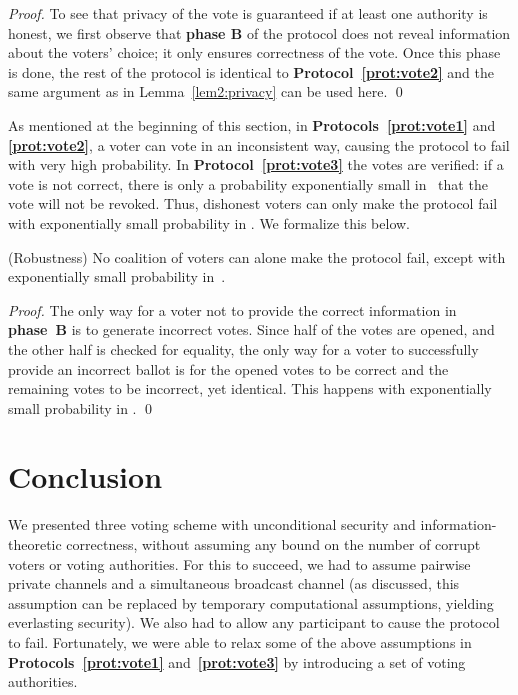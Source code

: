\documentclass[runningheads]{llncs}
\begin{document}
\begin{proof}
To see that privacy of the vote is guaranteed if at least one
authority is honest, we first observe that \textbf{phase B} of the
protocol does not reveal information about the voters' choice; it
only ensures correctness of the vote. Once this phase is done, the
rest of the protocol is identical to
\textbf{Protocol~\ref{prot:vote2}} and the same argument as in
Lemma~\ref{lem2:privacy} can be used here. \qed
\end{proof}

As mentioned at the beginning of this section, in
\textbf{Protocols~\ref{prot:vote1}} and \textbf{\ref{prot:vote2}}, a
voter can vote in an inconsistent way, causing the protocol to fail
with very high probability. In \textbf{Protocol~\ref{prot:vote3}}
the votes are verified: if a vote is not correct, there is only a
probability exponentially small in~ that the vote will not be
revoked. Thus, dishonest voters can only make the protocol fail with
exponentially small probability in . We formalize this below.


\begin{lemma}(Robustness)
\label{lem3:robustness} No coalition of voters can alone make the
protocol fail, except with exponentially small probability in~.
\end{lemma}

\begin{proof}
The only way for a voter not to provide the correct information in
\textbf{phase~B} is to generate incorrect votes. Since half of the
votes are opened, and the other half is checked for equality, the
only way for a voter to successfully provide an incorrect ballot is
for the  opened votes to be correct and the  remaining votes
to be incorrect, yet identical. This happens with exponentially
small probability in . \qed
\end{proof}

\section{Conclusion}

We presented three voting scheme with unconditional security and
information-theoretic correctness,  without assuming any bound on
the number of corrupt voters or voting authorities. For this to
succeed, we had to assume pairwise private channels and a
simultaneous broadcast channel (as discussed, this assumption can be
replaced by temporary computational assumptions, yielding
everlasting security). We also had to allow any participant to cause
the protocol to fail. Fortunately, we were able to relax some of the
above assumptions in \textbf{Protocols~\ref{prot:vote1}}
and~\textbf{\ref{prot:vote3}} by introducing a set of voting
authorities.
\end{document}
